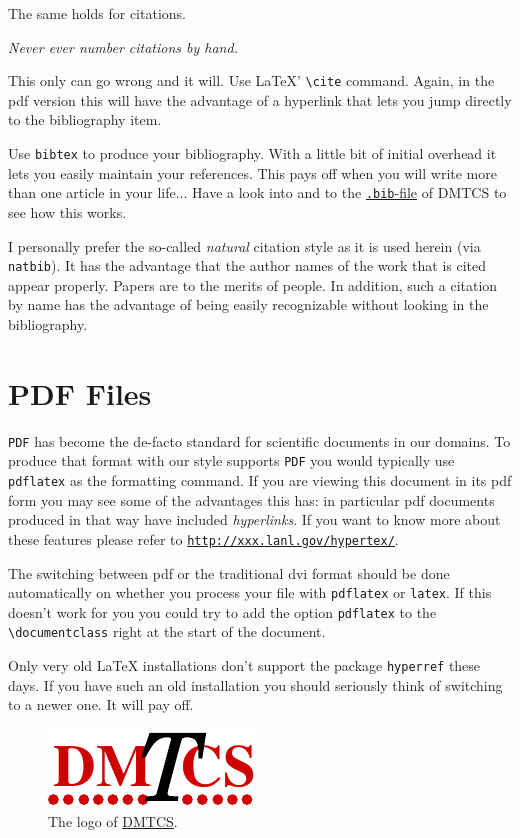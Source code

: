 \documentclass[
submission
]{dmtcs-episciences}
\begin{document}
The same holds for citations.
\begin{center}
  \emph{Never ever number citations by hand.}
\end{center}
This only can go wrong and it will. Use \LaTeX{}' \verb!\cite!
command. Again, in the pdf version this will have the advantage of a
hyperlink that lets you jump directly to the bibliography item.

Use \texttt{bibtex} to produce your bibliography. With a little bit of
initial overhead it lets you easily maintain your references. This
pays off when you will write more than one article in your life...
Have a look into \cite{oetiker99:_not_so_short_introd_latex} and to
the
\href{http://www.dmtcs.org/abstracts/bib/DMTCS.bib}{\texttt{.bib}-file}
of DMTCS to see how this works.

I personally prefer the so-called \emph{natural} citation style as it
is used herein (via \texttt{natbib}). It has the advantage that the
author names of the work that is cited appear properly. Papers are to
the merits of people. In addition, such a citation by
name has the advantage of being easily recognizable without looking in
the bibliography. 


\section{PDF Files}
\label{sec:pdf}
\texttt{PDF} has become the de-facto standard for scientific documents
in our domains. To produce that format with our style supports
\texttt{PDF} you would typically use \texttt{pdflatex}
as the formatting command. If you are viewing this document in its pdf
form you may see some of the advantages this has: in particular pdf
documents produced in that way have included \emph{hyperlinks}. If you
want to know more about these features please refer to
\href{http://xxx.lanl.gov/hypertex/}{\texttt{http://xxx.lanl.gov/hypertex/}}.

The switching between pdf or the traditional dvi format should be done
automatically on whether you process your file with \texttt{pdflatex}
or \texttt{latex}. If this doesn't work for you you could try to add
the option \texttt{pdflatex} to the \verb!\documentclass! right at the
start of the document.

Only very old \LaTeX{} installations don't support the package
\texttt{hyperref} these days. If you have such an old installation you
should seriously think of switching to a newer one. It will pay off.

\begin{figure}[htbp]
  \begin{center}
    \includegraphics{dmtcs}
    \caption{The logo of \protect\href{http://www.dmtcs.org/}{DMTCS}.}
    \label{fig:logo}
  \end{center}
\end{figure}
\end{document}
